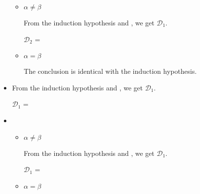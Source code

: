 \begin{itemize}
	      \begin{itemize}
	      		      		      	
	      	\item $\alpha \neq \beta$
	      	      	      	      	      	      
	      	      From the induction hypothesis and \TCsp, we get $\mathcal{D}_1$.
	      	      	      	      	      	      
	      	      $\mathcal{D}_2$ = 
	      	      {}
	      	      	      	      	      	      
	      	\item $\alpha = \beta$
	      	      	      	      	      	      
	      	      The conclusion is identical with the induction hypothesis.
	      	      	      	      	      	      
	      \end{itemize}
	      	      	      
	\item \QKAbs
	      	      	      
	      From the induction hypothesis and \QKAbs, we get $\mathcal{D}_1$.
	      	      	      
	      $\mathcal{D}_1$ = 
	      { \andalso
	      	 }
	      	      	      
	\item \QKCsp
	      	      	      
	      \begin{itemize}
	      		      		      	
	      	\item $\alpha \neq \beta$
	      	      	      	      	      	      
	      	      From the induction hypothesis and \QKCsp, we get $\mathcal{D}_1$.
	      	      	      	      	      	      
	      	      $\mathcal{D}_1$ = 
	      	      {}
	      	      	      	      	      	      
	      	      	      	      	      	      
	      	\item $\alpha = \beta$
	      	      	      	      	      	      

\end{itemize}
\end{itemize}
